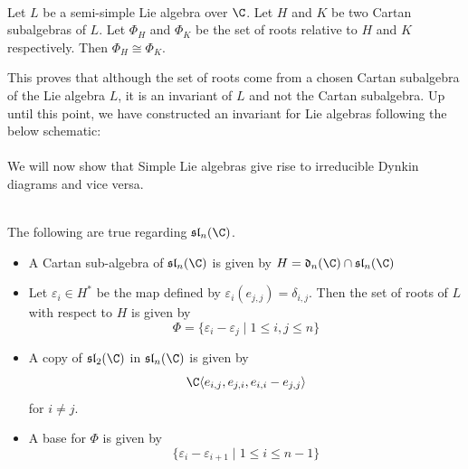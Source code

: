 \documentclass[a4paper]{article}
\begin{document}
\begin{prp}{}{} \\Let $L$ be a semi-simple Lie algebra over $\C$. Let $H$ and $K$ be two Cartan subalgebras of $L$. Let $\Phi_H$ and $\Phi_K$ be the set of roots relative to $H$ and $K$ respectively. Then $\Phi_H\cong\Phi_K$. 
\end{prp}

This proves that although the set of roots come from a chosen Cartan subalgebra of the Lie algebra $L$, it is an invariant of $L$ and not the Cartan subalgebra. Up until this point, we have constructed an invariant for Lie algebras following the below schematic: \\
 \\

We will now show that Simple Lie algebras give rise to irreducible Dynkin diagrams and vice versa. 

\begin{eg}{}{} \\The following are true regarding $\mathfrak{sl}_n(\C)$. 
\begin{itemize}
\item A Cartan sub-algebra of $\mathfrak{sl}_n(\C)$ is given by $H=\mathfrak{d}_n(\C)\cap\mathfrak{sl}_n(\C)$
\item Let $\varepsilon_i\in H^\ast$ be the map defined by $\varepsilon_i(e_{j,j})=\delta_{i,j}$. Then the set of roots of $L$ with respect to $H$ is given by $$\Phi=\{\varepsilon_i-\varepsilon_j\;|\;1\leq i,j\leq n\}$$
\item A copy of $\mathfrak{sl}_2(\C)$ in $\mathfrak{sl}_n(\C)$ is given by $$\C\langle e_{i,j},e_{j,i}, e_{i,i}-e_{j,j}\rangle$$ for $i\neq j$. 
\item A base for $\Phi$ is given by $$\{\varepsilon_i-\varepsilon_{i+1}\;|\;1\leq i\leq n-1\}$$
\end{itemize}
\end{eg}
\end{document}
